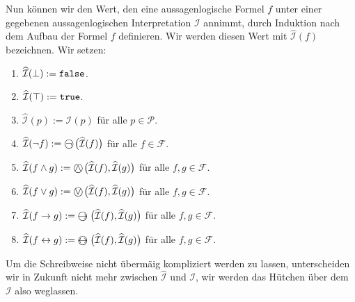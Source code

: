 \begin{table}[!ht]
  \centering
{}
  \caption{Interpretation der Junktoren.}
  \label{tab:aussagen-logik}
\end{table}
Nun k\"{o}nnen wir den Wert, den eine aussagenlogische Formel $f$ unter einer gegebenen
aussagenlogischen Interpretation $\mathcal{I}$ annimmt, durch Induktion nach dem Aufbau
der Formel $f$ definieren.  Wir werden diesen Wert mit $\widehat{\mathcal{I}}(f)$
bezeichnen.  Wir setzen:
\begin{enumerate}
\item $\widehat{\mathcal{I}}(\bot) := \mathtt{false}$.
\item $\widehat{\mathcal{I}}(\top) := \mathtt{true}$.
\item $\widehat{\mathcal{I}}(p) := \mathcal{I}(p)$ f\"{u}r alle $p \in \mathcal{P}$.
\item $\widehat{\mathcal{I}}(\neg f) := \circneg\;\bigl(\widehat{\mathcal{I}}(f)\bigr)$ f\"{u}r alle $f \in \mathcal{F}$.
\item $\widehat{\mathcal{I}}(f \wedge g) := \circwedge\;\bigl(\widehat{\mathcal{I}}(f), \widehat{\mathcal{I}}(g)\bigr)$ 
      f\"{u}r alle $f, g \in \mathcal{F}$.
\item $\widehat{\mathcal{I}}(f \vee g) := \circvee\;\bigl(\widehat{\mathcal{I}}(f), \widehat{\mathcal{I}}(g)\bigr)$ 
      f\"{u}r alle $f, g \in \mathcal{F}$.
\item $\widehat{\mathcal{I}}(f \rightarrow g) := \circright\;\bigl(\widehat{\mathcal{I}}(f), \widehat{\mathcal{I}}(g)\bigr)$ 
      f\"{u}r alle $f, g \in \mathcal{F}$.
\item $\widehat{\mathcal{I}}(f \leftrightarrow g) := \circleftright\;\bigl(\widehat{\mathcal{I}}(f), \widehat{\mathcal{I}}(g)\bigr)$ 
      f\"{u}r alle $f, g \in \mathcal{F}$.
\end{enumerate}
Um die Schreibweise nicht \"{u}berm\"{a}\3ig kompliziert werden zu lassen, unterscheiden wir in
Zukunft nicht  mehr zwischen $\widehat{\mathcal{I}}$ und $\mathcal{I}$, wir werden das H\"{u}tchen \"{u}ber dem
$\mathcal{I}$ also weglassen.

